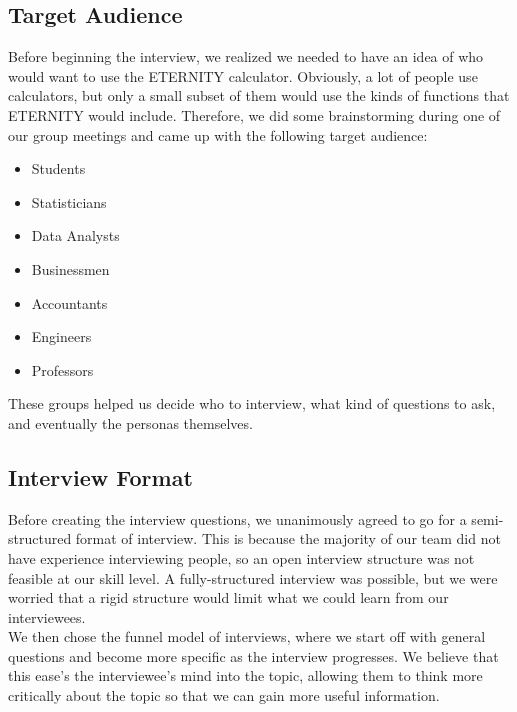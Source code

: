 \documentclass[11pt,onside]{report}
\begin{document}
\subsection{Target Audience}
Before beginning the interview, we realized we needed to have an idea of who would want to use the ETERNITY calculator. Obviously, a lot of people use calculators, but only a small subset of them would use the kinds of functions that ETERNITY would include. Therefore, we did some brainstorming during one of our group meetings and came up with the following target audience:
\begin{itemize}
    \item Students
    \item Statisticians
    \item Data Analysts
    \item Businessmen
    \item Accountants
    \item Engineers
    \item Professors
\end{itemize}
These groups helped us decide who to interview, what kind of questions to ask, and eventually the personas themselves.

\subsection{Interview Format}
Before creating the interview questions, we unanimously agreed to go for a semi-structured format of interview. This is because the majority of our team did not have experience interviewing people, so an open interview structure was not feasible at our skill level. A fully-structured interview was possible, but we were worried that a rigid structure would limit what we could learn from our interviewees. \\

We then chose the funnel model of interviews, where we start off with general questions and become more specific as the interview progresses. We believe that this ease's the interviewee's mind into the topic, allowing them to think more critically about the topic so that we can gain more useful information.
\end{document}
